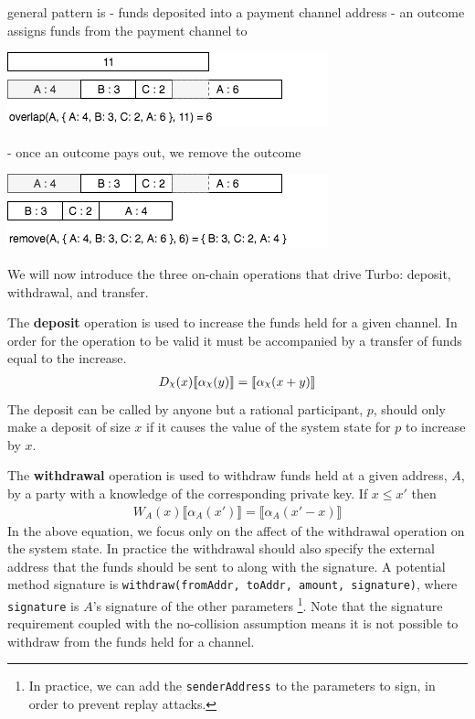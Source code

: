 \documentclass{article}
\DeclareRobustCommand{\rchi}{{\mathpalette\irchi\relax}}
\newcommand{\irchi}[2]{\raisebox{\depth}{$#1\chi$}} %
\theoremstyle{definition}
\newcommand{\adj}[1]{\llbracket #1 \rrbracket}
\begin{document}
general pattern is 
- funds deposited into a payment channel address
- an outcome assigns funds from the payment channel to 




\begin{center}
  \includegraphics[scale=0.7]{overlap} %
\end{center}

- once an outcome pays out, we remove the outcome

\begin{center}
  \includegraphics[scale=0.7]{remove} %
\end{center}



We will now introduce the three on-chain operations that drive Turbo: deposit, withdrawal,
and transfer.

The \textbf{deposit} operation is used to increase the funds held for a given channel.
In order for the operation to be valid it must be accompanied by a transfer of funds equal 
to the increase.
\begin{align*}
D_\rchi(x) \adj{\alpha_\rchi(y)} = \adj{\alpha_\rchi(x + y)}
\end{align*}
The deposit can be called by anyone but a rational participant, $p$, should only make a
deposit of size $x$ if it causes the value of the system state for $p$ to increase by $x$.

The \textbf{withdrawal} operation is used to withdraw funds held at a given 
address, $A$, by a party with a knowledge of the corresponding private key. If $x \leq x'$ then
\begin{align*}
W_A(x) \adj{\alpha_A(x')} = \adj{\alpha_A(x'-x)}
\end{align*}
In the above equation, we focus only on the affect of the withdrawal operation on the system state.
In practice the withdrawal should also specify the external address that the funds should be sent to
along with the signature.
A potential method signature is \texttt{withdraw(fromAddr, toAddr, amount, signature)}, 
where \texttt{signature} is $A$'s signature of the other parameters
\footnote{In practice, we can add the \texttt{senderAddress} to the parameters to sign,
in order to prevent replay attacks.}.
Note that the signature requirement coupled with the no-collision assumption means
it is not possible to withdraw from the funds held for a channel.
\end{document}
